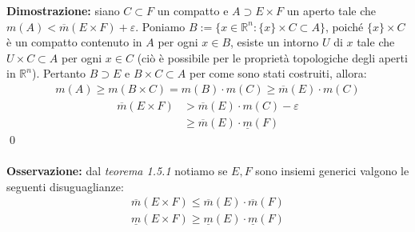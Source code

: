 \documentclass{article}
\numberwithin{equation}{subsection}
\begin{document}
\textbf{Dimostrazione:} siano $C \subset F$ un compatto e $A \supset E \times F$ un aperto tale che $m(A) < \overline{m}(E \times F) + \varepsilon$. Poniamo $B := \{ x \in \mathbb{R}^n : \{ x \} \times C \subset A \}$, poiché $\{ x \} \times C$ è un compatto contenuto in $A$ per ogni $x \in B$, esiste un intorno $U$ di $x$ tale che $U \times C \subset A$ per ogni $x \in C$ (ciò è possibile per le proprietà topologiche degli aperti in $\mathbb{R}^n$). Pertanto $B \supset E$ e $B \times C \subset A$ per come sono stati costruiti, allora:
\begin{gather*}
    m(A) \geq m(B \times C) = m(B) \cdot m(C) \geq \overline{m}(E) \cdot m(C) 
\end{gather*}
\begin{align*}
    \overline{m}(E \times F) &> \overline{m}(E) \cdot m(C) - \varepsilon  \\
    &\geq \overline{m}(E) \cdot \underline{m}(F) 
\end{align*} \qed
\\ \\
\textbf{Osservazione:} dal \textit{teorema 1.5.1} notiamo se $E, F$ sono insiemi generici valgono le seguenti disuguaglianze:
\begin{gather*}
    \overline{m}(E \times F) \leq \overline{m}(E) \cdot \overline{m}(F)  \\
    \underline{m}(E \times F) \geq \underline{m}(E) \cdot \underline{m}(F) 
\end{gather*} \newpage
\end{document}
